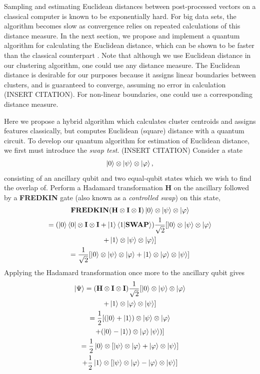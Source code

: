 \documentclass[twocolumn, english]{revtex4-2}
\begin{document}
Sampling and estimating Euclidean distances between post-processed vectors on a classical computer is known to be exponentially hard. For big data sets, the algorithm becomes slow as convergence relies on repeated calculations of this distance measure. In the next section, we propose and implement a quantum algorithm for calculating the Euclidean distance, which can be shown to be faster than the classical counterpart \cite{lloydlearning}. Note that although we use Euclidean distance in our clustering algorithm, one could use any distance measure. The Euclidean distance is desirable for our purposes because it assigns linear boundaries between clusters, and is guaranteed to converge, assuming no error in calculation (INSERT CITATION). For non-linear boundaries, one could use a corresponding distance measure. 

Here we propose a hybrid algorithm which calculates cluster centroids and assigns features classically, but computes Euclidean (square) distance with a quantum circuit. To develop our quantum algorithm for estimation of Euclidean distance, we first must introduce the \textit{swap test}. (INSERT CITATION) Consider a state \begin{equation}\ket{0}\otimes\ket{\psi}\otimes\ket{\varphi},\end{equation} consisting of an ancillary qubit and two equal-qubit states which we wish to find the overlap of. Perform a Hadamard transformation \textbf{H} on the ancillary followed by a \textbf{FREDKIN} gate (also known as a \textit{controlled swap}) on this state, \begin{equation}\begin{gathered}
\textbf{FREDKIN}(\textbf{H}\otimes\textbf{I}\otimes\textbf{I})\ket{0}\otimes\ket{\psi}\otimes\ket{\varphi}\\
=(\ket{0}\bra{0}\otimes\textbf{I}\otimes\textbf{I}+\ket{1}\braket{1|\textbf{SWAP}})\frac{1}{\sqrt{2}}[\ket{0}\otimes\ket{\psi}\otimes\ket{\varphi}\\+\ket{1}\otimes\ket{\psi}\otimes\ket{\varphi}]\\
=\frac{1}{\sqrt{2}}[\ket{0}\otimes\ket{\psi}\otimes\ket{\varphi}+\ket{1}\otimes\ket{\varphi}\otimes\ket{\psi}]\end{gathered}\end{equation}
Applying the Hadamard transformation once more to the ancillary qubit gives
\begin{equation}\begin{gathered}
\ket{\Psi}=(\textbf{H}\otimes\textbf{I}\otimes\textbf{I})\frac{1}{\sqrt{2}}[\ket{0}\otimes\ket{\psi}\otimes\ket{\varphi}\\+\ket{1}\otimes\ket{\varphi}\otimes\ket{\psi}]\\
=\frac{1}{2}[(\ket{0}+\ket{1})\otimes\ket{\psi}\otimes\ket{\varphi}\\+(\ket{0}-\ket{1})\otimes\ket{\varphi}\ket{\psi})]\\
=\frac{1}{2}\ket{0}\otimes[\ket{\psi}\otimes\ket{\varphi}+\ket{\varphi}\otimes\ket{\psi}]\\+\frac{1}{2}\ket{1}\otimes[\ket{\psi}\otimes\ket{\varphi}-\ket{\varphi}\otimes\ket{\psi}]
\end{gathered}\end{equation}
\end{document}
